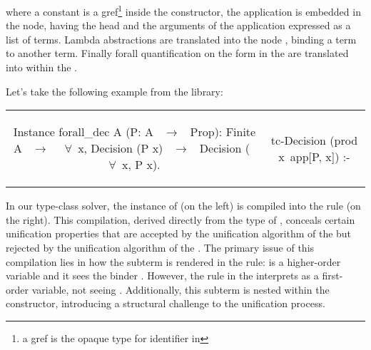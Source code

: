 \documentclass{rapport}
\begin{document}
\noindent where a \coq constant is a gref\footnote{a gref is the opaque type for \coq
identifier in \elpi} inside the  constructor, the \coq application
is embedded in the  node, having the head and the arguments of the
application expressed as a list of terms. Lambda abstractions are translated
into the node , binding a term to another term. Finally forall
quantification on the form  in the \ol are translated
into  within the \ml.


Let's take the following example from the \stdpp library:

\noindent %
\begin{tabular}{c|c}
  \begin{minipage}[c]{0.50\linewidth}
    \begin{coqcode}
      Instance forall_dec A (P: A ~$\to$~ Prop):
        Finite A ~$\to$~ 
        ~$\forall$~x, Decision (P x) ~$\to$~
        Decision (~$\forall$~x, P x).
    \end{coqcode}
  \end{minipage}
  &
  \begin{minipage}[c]{0.46\linewidth}
    \begin{elpicode}
      tc-Decision (prod x\ app[P, x]) :- 
    \end{elpicode}
  \end{minipage}
\end{tabular}

\noindent In our type-class solver, the  instance 
of \coq (on the left) is compiled into the \elpi rule (on the right). This 
compilation, derived
directly from the type of , conceals certain unification
properties that are accepted by the unification algorithm of the \ol but 
rejected by the unification algorithm of the \ml. The primary issue of this
compilation lies in how the subterm  is rendered in
the \ml rule:  is a higher-order variable and it
sees the binder . However, the rule in the \ml interprets  as a 
first-order variable, not seeing . Additionally, this subterm is
nested within the  constructor, introducing a structural challenge 
to the unification process.
\end{document}
